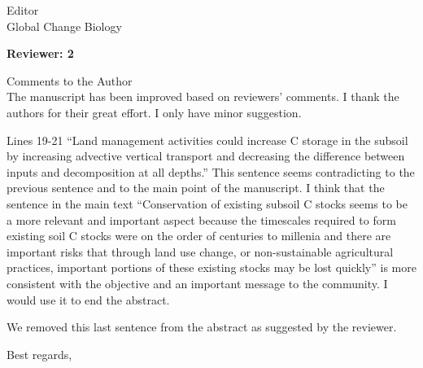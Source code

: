 \documentclass[11pt]{bgcletter}
\newcommand{\answer}[1] {
{\color{cyan} #1}
}
\begin{document}
\begin{letter}{Editor\\
   Global Change Biology
}

\newpage

\textbf{Reviewer: 2}

Comments to the Author \\
The manuscript has been improved based on reviewers’ comments. I thank the authors for their great effort. I only have minor suggestion.

Lines 19-21 “Land management activities could increase C storage in the subsoil by increasing advective vertical transport and decreasing the difference between inputs and decomposition at all depths.” This sentence seems contradicting to the previous sentence and to the main point of the manuscript. I think that the sentence in the main text “Conservation of existing subsoil C stocks seems to be a more relevant and important aspect because the timescales required to form existing soil C stocks were on the order of centuries to millenia and there are important risks that through land use change, or non-sustainable agricultural practices, important portions of these existing stocks may be lost quickly” is more consistent with the objective and an important message to the community. I would use it to end the abstract.

\answer{We removed this last sentence from the abstract as suggested by the reviewer.}

 \closing{Best regards,} 
 \end{letter}

 
\end{document}

